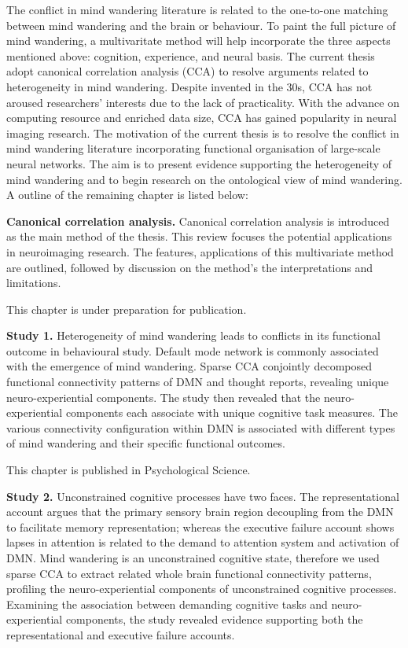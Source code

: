 The conflict in mind wandering literature is related to the one-to-one matching between mind wandering and the brain or behaviour. To paint the full picture of mind wandering, a multivaritate method will help incorporate the three aspects mentioned above: cognition, experience, and neural basis. The current thesis adopt canonical correlation analysis (CCA) to resolve arguments related to heterogeneity in mind wandering. Despite invented in the 30s, CCA has not aroused researchers’ interests due to the lack of practicality. With the advance on computing resource and enriched data size, CCA has gained popularity in neural imaging research. The motivation of the current thesis is to resolve the conflict in mind wandering literature incorporating functional organisation of large-scale neural networks. The aim is to present evidence supporting the heterogeneity of mind wandering and to begin research on the ontological view of mind wandering. A outline of the remaining chapter is listed below: 

\textbf{Canonical correlation analysis.}
Canonical correlation analysis is introduced as the main method of the thesis. This review focuses the potential applications in neuroimaging research. The features, applications of this multivariate method are outlined, followed by discussion on the method's the interpretations and limitations. 

This chapter is under preparation for publication.  

\textbf{Study 1.}
Heterogeneity of mind wandering leads to conflicts in its functional outcome in behavioural study. Default mode network is commonly associated with the emergence of mind wandering. Sparse CCA conjointly decomposed functional connectivity patterns of DMN and thought reports, revealing unique neuro-experiential components. The study then revealed that the neuro-experiential components each associate with unique cognitive task measures. The various connectivity configuration within DMN is associated with different types of mind wandering and their specific functional outcomes.

This chapter is published in Psychological Science.

\textbf{Study 2.}
Unconstrained cognitive processes have two faces. The representational account argues that the primary sensory brain region decoupling from the DMN to facilitate memory representation; whereas the executive failure account shows lapses in attention is related to the demand to attention system and activation of DMN. Mind wandering is an unconstrained cognitive state, therefore we used sparse CCA to extract related whole brain functional connectivity patterns, profiling the neuro-experiential components of unconstrained cognitive processes. Examining the association between demanding cognitive tasks and neuro-experiential components, the study revealed evidence supporting both the representational and executive failure accounts.


